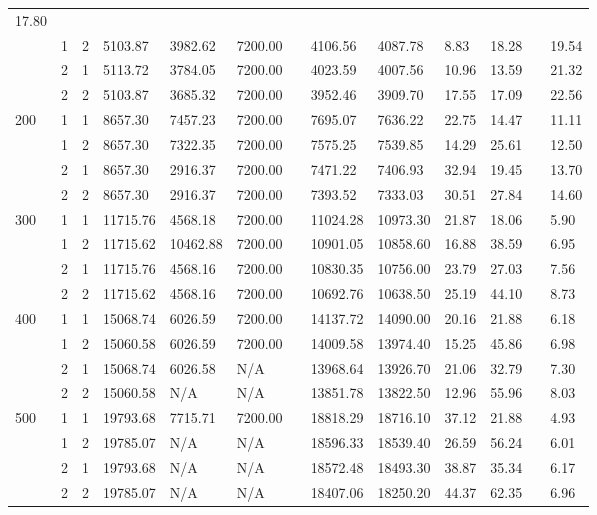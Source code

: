 \documentclass[
  english,
]{article}
\begin{document}
\begin{otherlanguage}{english}
{\begin{longtable}[]{@{}lllllllllllll@{}}
17.80 \\
& 1 & 2 & 5103.87 & 3982.62 & 7200.00 & & 4106.56 & 4087.78 & 8.83 & 18.28 & & 19.54 \\
& 2 & 1 & 5113.72 & 3784.05 & 7200.00 & & 4023.59 & 4007.56 & 10.96 & 13.59 & & 21.32 \\
& 2 & 2 & 5103.87 & 3685.32 & 7200.00 & & 3952.46 & 3909.70 & 17.55 & 17.09 & & 22.56 \\
\multirow{4}{*}{200} & 1 & 1 & 8657.30 & 7457.23 & 7200.00 & & 7695.07 & 7636.22 & 22.75 & 14.47 & &
11.11 \\
& 1 & 2 & 8657.30 & 7322.35 & 7200.00 & & 7575.25 & 7539.85 & 14.29 & 25.61 & & 12.50 \\
& 2 & 1 & 8657.30 & 2916.37 & 7200.00 & & 7471.22 & 7406.93 & 32.94 & 19.45 & & 13.70 \\
& 2 & 2 & 8657.30 & 2916.37 & 7200.00 & & 7393.52 & 7333.03 & 30.51 & 27.84 & & 14.60 \\
\multirow{4}{*}{300} & 1 & 1 & 11715.76 & 4568.18 & 7200.00 & & 11024.28 & 10973.30 & 21.87 & 18.06
& & 5.90 \\
& 1 & 2 & 11715.62 & 10462.88 & 7200.00 & & 10901.05 & 10858.60 & 16.88 & 38.59 & & 6.95 \\
& 2 & 1 & 11715.76 & 4568.16 & 7200.00 & & 10830.35 & 10756.00 & 23.79 & 27.03 & & 7.56 \\
& 2 & 2 & 11715.62 & 4568.16 & 7200.00 & & 10692.76 & 10638.50 & 25.19 & 44.10 & & 8.73 \\
\multirow{4}{*}{400} & 1 & 1 & 15068.74 & 6026.59 & 7200.00 & & 14137.72 & 14090.00 & 20.16 & 21.88
& & 6.18 \\
& 1 & 2 & 15060.58 & 6026.59 & 7200.00 & & 14009.58 & 13974.40 & 15.25 & 45.86 & & 6.98 \\
& 2 & 1 & 15068.74 & 6026.58 & N/A & & 13968.64 & 13926.70 & 21.06 & 32.79 & & 7.30 \\
& 2 & 2 & 15060.58 & N/A & N/A & & 13851.78 & 13822.50 & 12.96 & 55.96 & & 8.03 \\
\multirow{4}{*}{500} & 1 & 1 & 19793.68 & 7715.71 & 7200.00 & & 18818.29 & 18716.10 & 37.12 & 21.88
& & 4.93 \\
& 1 & 2 & 19785.07 & N/A & N/A & & 18596.33 & 18539.40 & 26.59 & 56.24 & & 6.01 \\
& 2 & 1 & 19793.68 & N/A & N/A & & 18572.48 & 18493.30 & 38.87 & 35.34 & & 6.17 \\
& 2 & 2 & 19785.07 & N/A & N/A & & 18407.06 & 18250.20 & 44.37 & 62.35 & & 6.96 \\
\end{longtable}
}


\end{otherlanguage}
\end{document}
